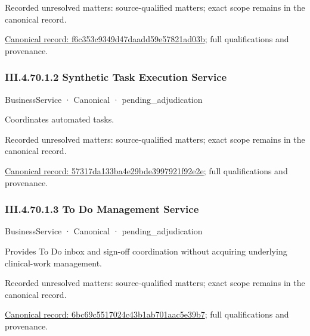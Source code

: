 {\small Recorded unresolved matters: source-qualified matters; exact scope remains in the canonical record.}\par
{\footnotesize \href{../../../../continuum/business/business-service/f6c353c9349d47daadd59e57821ad03b.md}{Canonical record: f6c353c9349d47daadd59e57821ad03b}; full qualifications and provenance.}\par
\subsubsection*{III.4.70.1.2 Synthetic Task Execution Service}
\label{navigation:III.4.70.1.2}

\label{element:57317da133ba4e29bde3997921f92e2e}
{\small BusinessService · Canonical · pending\_adjudication}\par

Coordinates automated tasks.


{\small Recorded unresolved matters: source-qualified matters; exact scope remains in the canonical record.}\par
{\footnotesize \href{../../../../continuum/business/business-service/57317da133ba4e29bde3997921f92e2e.md}{Canonical record: 57317da133ba4e29bde3997921f92e2e}; full qualifications and provenance.}\par
\subsubsection*{III.4.70.1.3 To Do Management Service}
\label{navigation:III.4.70.1.3}

\label{element:6bc69c5517024c43b1ab701aac5e39b7}
{\small BusinessService · Canonical · pending\_adjudication}\par

Provides To Do inbox and sign-off coordination without acquiring underlying clinical-work management.


{\small Recorded unresolved matters: source-qualified matters; exact scope remains in the canonical record.}\par
{\footnotesize \href{../../../../continuum/business/business-service/6bc69c5517024c43b1ab701aac5e39b7.md}{Canonical record: 6bc69c5517024c43b1ab701aac5e39b7}; full qualifications and provenance.}\par
